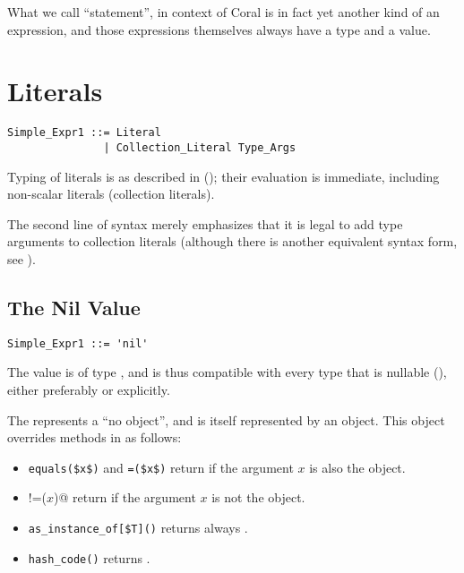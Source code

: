 What we call ``statement'', in context of Coral is in fact yet another kind of an expression, and those expressions themselves always have a type and a value. 





\section{Literals}

\syntax\begin{lstlisting}
Simple_Expr1 ::= Literal
               | Collection_Literal Type_Args
\end{lstlisting}

Typing of literals is as described in (); their evaluation is immediate, including non-scalar literals (collection literals). 

The second line of syntax merely emphasizes that it is legal to add type arguments to collection literals (although there is another equivalent syntax form, see ). 






\subsection{The Nil Value}

\syntax\begin{lstlisting}
Simple_Expr1 ::= 'nil'
\end{lstlisting}

The  value is of type , and is thus compatible with every type that is nullable (), either preferably or explicitly.

The  represents a ``no object'', and is itself represented by an object. This object overrides methods in  as follows: 
\begin{itemize}
\item 
\lstinline!equals($x$)! and \lstinline!=($x$)! return  if the argument $x$ is also the  object. 

\item 
\lstinline@!=($x$)@ return  if the argument $x$ is not the  object.

\item
\lstinline[mathescape=false]!as_instance_of[$T]()! returns always . 

\item
\lstinline!hash_code()! returns . 
\end{itemize}

